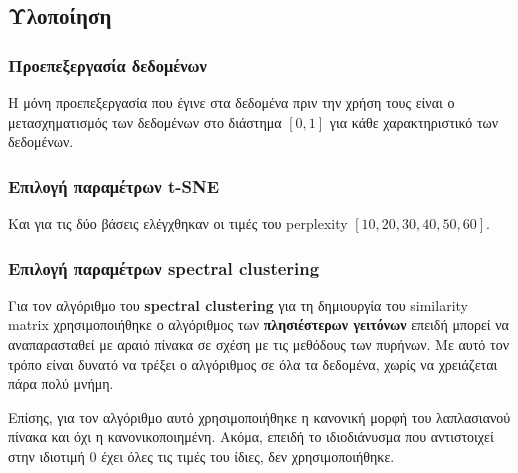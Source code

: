 \documentclass{beamer}
\begin{document}
\subsection{Υλοποίηση}

\begin{frame}
\frametitle{Προεπεξεργασία δεδομένων}

Η μόνη προεπεξεργασία που έγινε στα δεδομένα πριν την χρήση τους είναι ο
μετασχηματισμός των δεδομένων στο διάστημα $[0,1]$ για κάθε χαρακτηριστικό των
δεδομένων.

\end{frame}

\begin{frame}
\frametitle{Επιλογή παραμέτρων t-SNE}

Και για τις δύο βάσεις ελέγχθηκαν οι τιμές του perplexity $[10, 20, 30, 40, 50,
60]$.

\end{frame}

\begin{frame}
\frametitle{Επιλογή παραμέτρων spectral clustering}

Για τον αλγόριθμο του \textbf{spectral clustering} για τη δημιουργία του
similarity matrix χρησιμοποιήθηκε ο αλγόριθμος των \textbf{πλησιέστερων
γειτόνων} επειδή μπορεί να αναπαρασταθεί με αραιό πίνακα σε σχέση με τις
μεθόδους των πυρήνων. Με αυτό τον τρόπο είναι δυνατό να τρέξει ο αλγόριθμος σε
όλα τα δεδομένα, χωρίς να χρειάζεται πάρα πολύ μνήμη. \pause

Επίσης, για τον αλγόριθμο αυτό χρησιμοποιήθηκε η κανονική μορφή του λαπλασιανού
πίνακα και όχι η κανονικοποιημένη. Ακόμα, επειδή το ιδιοδιάνυσμα που αντιστοιχεί
στην ιδιοτιμή 0 έχει όλες τις τιμές του ίδιες, δεν χρησιμοποιήθηκε.

\end{frame}
\end{document}
